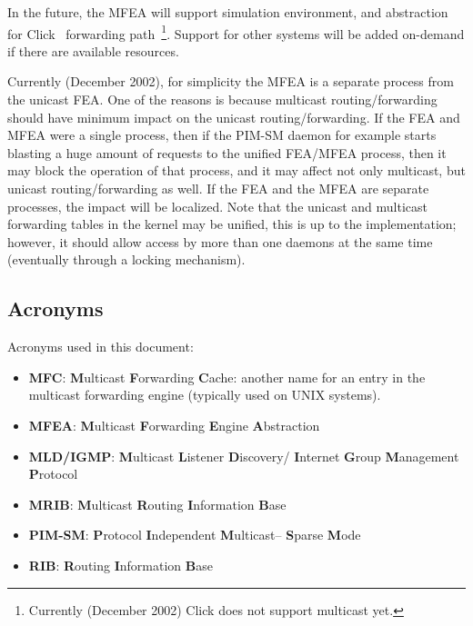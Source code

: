 \documentclass[11pt]{article}
\begin{document}
In the future, the MFEA will support simulation environment, and
abstraction for Click~\cite{CLICK-PROJECT} forwarding
path~\footnote{Currently (December 2002) Click does
not support multicast yet.}. Support for other systems will be added
on-demand if there are available resources.

Currently (December 2002), for simplicity the MFEA is a
separate process from the unicast FEA.  One of the reasons is because
multicast routing/forwarding should have minimum impact on the unicast
routing/forwarding. If the FEA and MFEA were a single process, then if
the PIM-SM daemon for example starts blasting a huge amount of requests
to the unified FEA/MFEA process, then it may block the operation of that
process, and it may affect not only multicast, but unicast
routing/forwarding as well. If the FEA and the MFEA are separate
processes, the impact will be localized.  Note that the unicast and
multicast forwarding tables in the kernel may be unified, this is up to
the implementation; however, it should allow access by more than one
daemons at the same time (eventually through a locking mechanism).

\subsection{Acronyms}

Acronyms used in this document:

\begin{itemize}

  \item {\bf MFC}: {\bf M}ulticast {\bf F}orwarding {\bf C}ache: another
  name for an entry in the multicast forwarding engine (typically used
  on UNIX systems).

  \item {\bf MFEA}: {\bf M}ulticast {\bf F}orwarding {\bf E}ngine
  {\bf A}bstraction

  \item {\bf MLD/IGMP}: {\bf M}ulticast {\bf L}istener {\bf D}iscovery/{\bf
  I}nternet {\bf G}roup {\bf M}anagement {\bf P}rotocol

  \item {\bf MRIB}: {\bf M}ulticast {\bf R}outing {\bf I}nformation
  {\bf B}ase

  \item {\bf PIM-SM}: {\bf P}rotocol {\bf I}ndependent {\bf M}ulticast--{\bf
  S}parse {\bf M}ode

  \item {\bf RIB}: {\bf R}outing {\bf I}nformation {\bf B}ase

\end{itemize}
\end{document}
